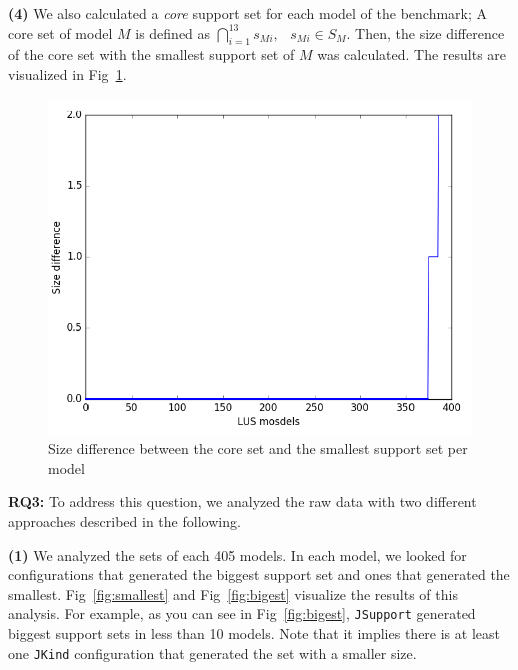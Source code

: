 \textbf{(4)} We also calculated a \emph{core} support set for each model of the benchmark; A core set of model $M$ is defined as
$\bigcap_{i=1}^{13} s_{Mi},   \hspace{9pt} s_{Mi} \in S_M$. Then, the size difference of the core set with the smallest support set of $M$ was calculated. The results are visualized in Fig~\ref{fig:core}.


\begin{figure}
  \centering
  \includegraphics[width=\textwidth]{figs/core.png}
  \caption{\small{Size difference between the core set and the smallest support set per model}}\label{fig:core}
\end{figure}

\vspace{6pt}
\noindent{}
 \vspace{9pt}

\textbf{RQ3:} To address this question, we analyzed the raw data with two different approaches described in the following.

\textbf{(1)} We analyzed the sets of each 405 models. In each model, we looked for configurations that generated the biggest support set and ones that generated the smallest. Fig~\ref{fig:smallest} and Fig~\ref{fig:bigest} visualize the results of this analysis. For example, as you can see in Fig~\ref{fig:bigest}, \texttt{JSupport} generated biggest support sets in less than 10 models. Note that it implies there is at least one \texttt{JKind} configuration that generated the set with a smaller size.


